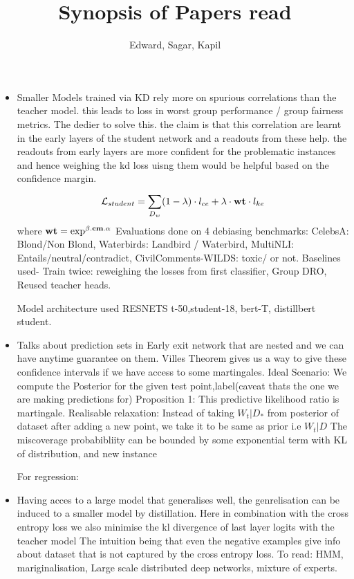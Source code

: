 \documentclass{article}
\begin{document}
\title{Synopsis of Papers read}
\author{Edward, Sagar, Kapil}
\maketitle

\begin{itemize}
    \item
          \cite{tiwari_using_2024}
          Smaller Models trained via KD rely more on spurious correlations than the teacher model. this leads to loss in
          worst group performance / group fairness metrics. The dedier to solve this. the claim is that this correlation
          are learnt in the early layers of the student network and a readouts from these help. the readouts from early layers
          are more confident for the problematic instances and hence weighing the kd loss uisng them would be helpful based on the confidence
          margin.
          \[ \mathcal{L}_{student} =
          \sum_{D_w}^{} (1- \lambda) \cdot l_{ce}  \\
          + \lambda \cdot \textbf{wt} \cdot l_{ke} \] 
          where \(\bf{wt} = \exp^{\beta.\bf{cm}.\alpha} \)  
          Evaluations done on 4 debiasing benchmarks: CelebsA: Blond/Non Blond, Waterbirds: Landbird / Waterbird, MultiNLI: Entails/neutral/contradict,
          CivilComments-WILDS: toxic/ or not. Baselines used- Train twice: reweighing the losses from first classifier, Group DRO, Reused teacher heads.

          Model architecture used RESNETS t-50,student-18, bert-T, distillbert student. 
    \item
          \cite{jazbec_early-exit_2024} Talks about prediction sets in Early exit network that are nested and we can have anytime guarantee on them.
          Villes Theorem gives us a way to give these confidence intervals if we have access to some martingales. 
          Ideal Scenario: We compute the Posterior for the given test point,label(caveat thats the one we are making predictions for)
          Proposition 1: This predictive likelihood ratio is martingale. Realisable relaxation: Instead of taking \(W_t|D_* \)  from posterior of dataset 
          after adding a new point, we take it to be same as prior i.e \(W_t|D \)  The miscoverage probabibliity can be bounded by some exponential term with KL of distribution, and new instance
          
          For regression: 
    \item
          \cite{hinton_distilling_2015} Having acces to a large model that generalises well, the genrelisation can be
          induced to a smaller model by distillation. Here in combination with the cross entropy loss we also minimise the
          kl divergence of last layer logits with the teacher model
          The intuition being that even the negative examples give info about dataset that is not captured by the cross entropy loss.
          To read: HMM, mariginalisation, Large scale distributed deep networks, mixture of experts.
\end{itemize}



 



\end{document}
